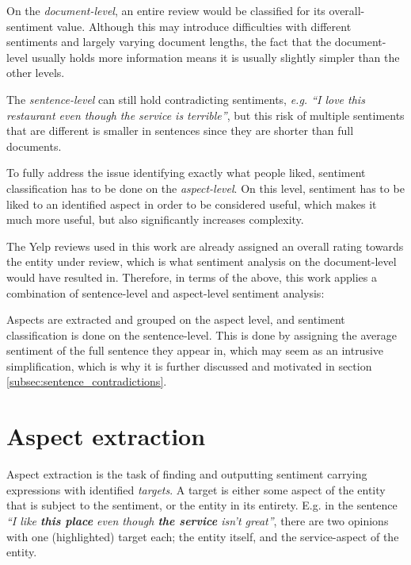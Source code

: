 \documentclass[a4paper,11pt]{kth-mag}
\begin{document}
On the \emph{document-level}, an entire review would be classified for
its overall-sentiment value\cite[Chapter~1.2]{liu2012sentiment}.
Although this may introduce difficulties with different sentiments
and largely varying document lengths, the fact that the document-level usually holds more information
means it is usually slightly simpler than the other levels.

The \emph{sentence-level} can still hold contradicting sentiments,
\emph{e.g. ``I love this restaurant even though the service is terrible''},
but this risk of multiple sentiments that are different is smaller in sentences
since they are shorter than full documents.

To fully address the issue identifying exactly what people liked,
sentiment classification has to be done on the \emph{aspect-level}.
On this level, sentiment has to be liked to an identified aspect in order to be considered
useful, which makes it much more useful, but also significantly increases complexity\cite[Chapter~1.2]{liu2012sentiment}.

The Yelp reviews used in this work are already assigned an overall rating towards the entity under
review, which is what sentiment analysis on the document-level would have resulted in.
Therefore, in terms of the above, this work applies a combination of sentence-level and aspect-level
sentiment analysis:

Aspects are extracted and grouped on the aspect level, and sentiment classification is done on
the sentence-level. This is done by assigning the average sentiment of the full sentence they appear in,
which may seem as an intrusive simplification, which is why it is
further discussed and motivated in section \ref{subsec:sentence_contradictions}.




\chapter{Aspect extraction}
\label{sec:aspect_extraction}

Aspect extraction is the task of finding and outputting sentiment carrying expressions
with identified \emph{targets}. A target is either some aspect of the entity that is
subject to the sentiment, or the entity in its entirety. E.g. in the sentence
\emph{``I like \textbf{this place} even though \textbf{the service} isn't great''},
there are two opinions with one (highlighted) target each; the entity itself, and the
service-aspect of the entity.
\end{document}
